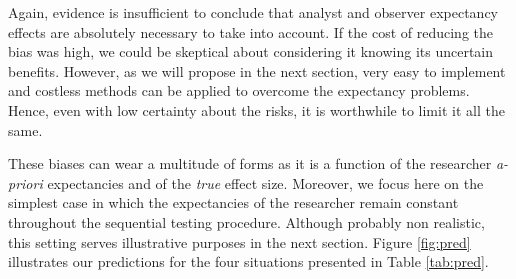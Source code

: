 \documentclass[a4paper,man,natbib,floatsintext,donotrepeattitle]{apa6}
\begin{document}
\begin{table}[H]
\centering
\caption{Possible interactions between true effect size and a priori beliefs on SBF. Congruent observations are expected to increase the speed of threshold reaching (H0+ and H1+), while incongruent observations are expected to slow down the process (H0- and H1-).}
\label{tab:pred}
\end{table}

Again, evidence is insufficient to conclude that analyst and observer expectancy effects are absolutely necessary to take into account. If the cost of reducing the bias was high, we could be skeptical about considering it knowing its uncertain benefits. However, as we will propose in the next section, very easy to implement and costless methods can be applied to overcome the expectancy problems. Hence, even with low certainty about the risks, it is worthwhile to limit it all the same. \par



These biases can wear a multitude of forms as it is a function of the researcher \textit{a-priori} expectancies and of the \textit{true} effect size. Moreover, we focus here on the simplest case in which the expectancies of the researcher remain constant throughout the sequential testing procedure. Although probably non realistic, this setting serves illustrative purposes in the next section. Figure \ref{fig:pred} illustrates our predictions for the four situations presented in Table \ref{tab:pred}.
\end{document}
